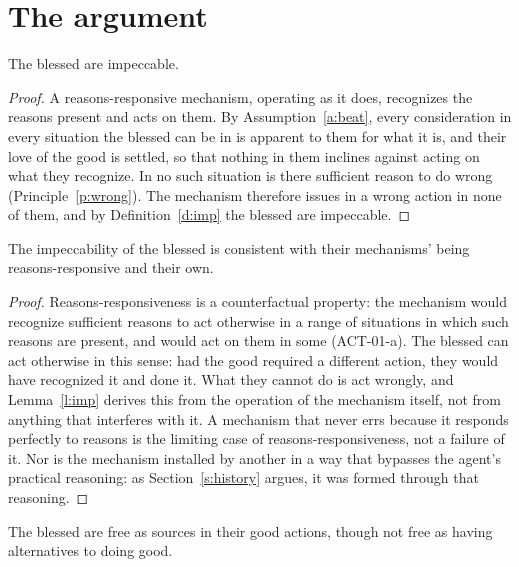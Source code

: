 \documentclass{situationist-preprint}
\begin{document}
\section{The argument}

\begin{lemma}\label{l:imp}
The blessed are impeccable.
\end{lemma}

\begin{proof}
A reasons-responsive mechanism, operating as it does, recognizes the reasons present and acts on them. By Assumption~\ref{a:beat}, every consideration in every situation the blessed can be in is apparent to them for what it is, and their love of the good is settled, so that nothing in them inclines against acting on what they recognize. In no such situation is there sufficient reason to do wrong (Principle~\ref{p:wrong}). The mechanism therefore issues in a wrong action in none of them, and by Definition~\ref{d:imp} the blessed are impeccable.
\end{proof}

\begin{lemma}\label{l:rr}
The impeccability of the blessed is consistent with their mechanisms' being reasons-responsive and their own.
\end{lemma}

\begin{proof}
Reasons-responsiveness is a counterfactual property: the mechanism would recognize sufficient reasons to act otherwise in a range of situations in which such reasons are present, and would act on them in some (ACT-01-a). The blessed can act otherwise in this sense: had the good required a different action, they would have recognized it and done it. What they cannot do is act wrongly, and Lemma~\ref{l:imp} derives this from the operation of the mechanism itself, not from anything that interferes with it. A mechanism that never errs because it responds perfectly to reasons is the limiting case of reasons-responsiveness, not a failure of it. Nor is the mechanism installed by another in a way that bypasses the agent's practical reasoning: as Section~\ref{s:history} argues, it was formed through that reasoning.
\end{proof}

\begin{theorem}\label{t:main}
The blessed are free as sources in their good actions, though not free as having alternatives to doing good.
\end{theorem}
\end{document}

